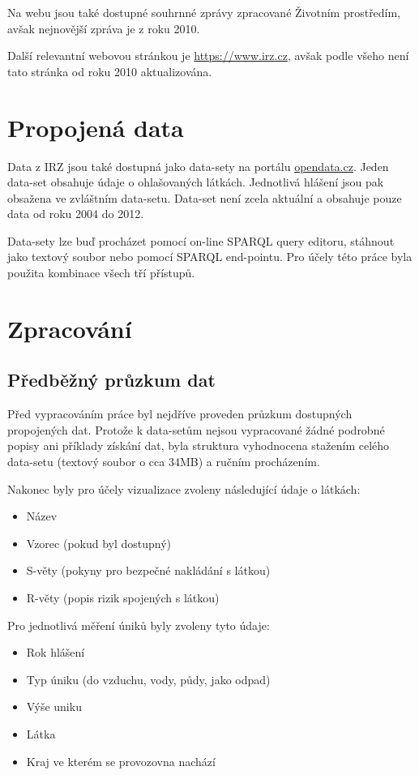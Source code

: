\documentclass[12pt]{article}
\begin{document}
Na webu jsou také dostupné souhrnné zprávy zpracované Životním prostředím, avšak nejnovější zpráva je z roku 2010.

Další relevantní webovou stránkou je \url{https://www.irz.cz}, avšak podle všeho není tato stránka od roku 2010 aktualizována.


\section*{Propojená data}
Data z IRZ jsou také dostupná jako data-sety na portálu \url{opendata.cz}. Jeden data-set obsahuje údaje o ohlašovaných látkách\cite{dataset-latky}. Jednotlivá hlášení jsou pak obsažena ve zvláštním data-setu\cite{dataset-hlaseni}. Data-set není zcela aktuální a obsahuje pouze data od roku 2004 do 2012.

Data-sety lze buď procházet pomocí on-line SPARQL query editoru, stáhnout jako textový soubor nebo pomocí SPARQL end-pointu. Pro účely této práce byla použita kombinace všech tří přístupů.


\section*{Zpracování}

\subsection*{Předběžný průzkum dat}
Před vypracováním práce byl nejdříve proveden průzkum dostupných propojených dat. Protože k data-setům nejsou vypracované žádné podrobné popisy ani příklady získání dat, byla struktura vyhodnocena stažením celého data-setu (textový soubor o cca 34MB) a ručním procházením.

Nakonec byly pro účely vizualizace zvoleny následující údaje o látkách:

	\begin{itemize}
		\item Název
		\item Vzorec (pokud byl dostupný)
		\item S-věty (pokyny pro bezpečné nakládání s látkou)
		\item R-věty (popis rizik spojených s látkou)
	\end{itemize}
	
Pro jednotlivá měření úniků byly zvoleny tyto údaje:

	\begin{itemize}
		\item Rok hlášení
		\item Typ úniku (do vzduchu, vody, půdy, jako odpad)
		\item Výše uniku
		\item Látka
		\item Kraj ve kterém se provozovna nachází
	\end{itemize}
	
\end{document}
